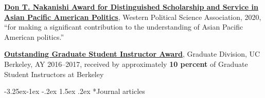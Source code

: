 \documentclass[10pt, letterpaper]{article}
\makeatletter
\renewcommand\subsection{\@startsection{subsection}{2}{\z@}%
  {-3.25ex\@plus -1ex \@minus -.2ex}%
  {1.5ex \@plus .2ex}%
  {\normalfont\large\bfseries\color{cvnavy}}}
\makeatother
\begin{document}
\begin{etaremune}
\item \textbf{\href{https://www.wpsanet.org/award/}{Don T. Nakanishi Award for Distinguished Scholarship and Service in Asian Pacific American Politics}}, Western Political Science Association, 2020, ``for making a significant contribution to the understanding of Asian Pacific American politics.''

\item \textbf{\href{https://gsi.berkeley.edu/programs-services/award-programs/ogsi/ogsi-2017/}{Outstanding Graduate Student Instructor Award}}, Graduate Division, UC Berkeley, AY 2016--2017, received by approximately \textbf{10 percent} of Graduate Student Instructors at Berkeley
\end{etaremune}

\subsection*{Journal articles}
\end{document}
